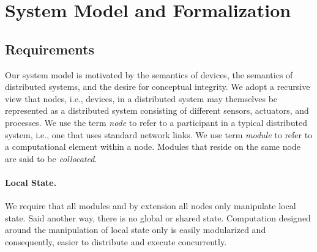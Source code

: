 \documentclass[letterpaper]{article}
\begin{document}



\pagebreak

\section{System Model and Formalization\label{system_model}}

\subsection{Requirements}

Our system model is motivated by the semantics of devices, the semantics of distributed systems, and the desire for conceptual integrity.
We adopt a recursive view that nodes, i.e., devices, in a distributed system may themselves be represented as a distributed system consisting of different sensors, actuators, and processes.
We use the term \emph{node} to refer to a participant in a typical distributed system, i.e., one that uses standard network links.
We use term \emph{module} to refer to a computational element within a node.
Modules that reside on the same node are said to be \emph{collocated}.

\paragraph{Local State.}
We require that all modules and by extension all nodes only manipulate local state.
Said another way, there is no global or shared state.
Computation designed around the manipulation of local state only is easily modularized and consequently, easier to distribute and execute concurrently.

\end{document}
